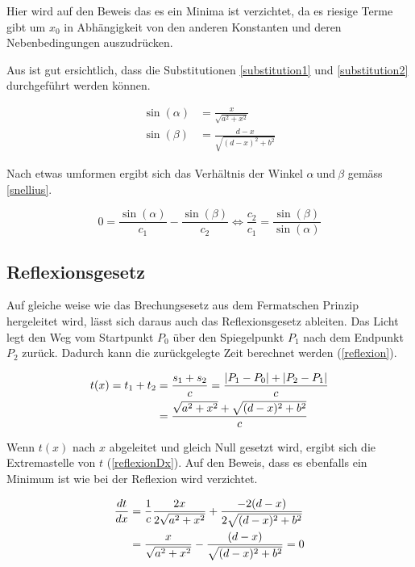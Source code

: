 Hier wird auf den Beweis das es ein Minima ist verzichtet, da es riesige Terme gibt um $x_0$ in Abhängigkeit von den anderen Konstanten und deren Nebenbedingungen auszudrücken.

Aus  ist gut ersichtlich, dass die Substitutionen \ref{substitution1} und \ref{substitution2} durchgeführt werden können.

\begin{align}
	\sin(\alpha) &= \frac{x}{\sqrt{a^2 + x^2}}  \label{substitution1}\\
	\sin(\beta) &= \frac{d-x}{\sqrt{(d -x)^2 + b^2}} \label{substitution2}
\end{align}

Nach etwas umformen ergibt sich das Verhältnis der Winkel $\alpha \ \text{und} \ \beta$ gemäss \eqref{snellius}.

\begin{equation}
	0 = \frac{\sin(\alpha)}{c_1} - \frac{\sin(\beta)}{c_2} \Leftrightarrow\frac{c_2}{c_1} = \frac{\sin(\beta)}{\sin(\alpha)}
	\label{snellius}
\end{equation}


\subsection{Reflexionsgesetz}
Auf gleiche weise wie das Brechungsesetz aus dem Fermatschen Prinzip hergeleitet wird, 
lässt sich daraus auch das Reflexionsgesetz ableiten.
Das Licht legt den Weg vom Startpunkt $P_0$ über den Spiegelpunkt $P_1$ 
nach dem Endpunkt $P_2$ zurück. Dadurch kann die zurückgelegte Zeit berechnet werden \cite{Wikipedia} (\eqref{reflexion}).


\begin{align}
t(x) = t_1 + t_2 &= \frac{s_1 + s_2}{c} = \frac{|P_1 - P_0| + |P_2 - P_1|}{c} \notag \\
&= \frac{\sqrt{a^2 + x^2} + \sqrt{(d-x)^2 + b^2}}{c} \label{reflexion}
\end{align}

Wenn $t(x)$ nach $x$ abgeleitet und gleich Null gesetzt wird, ergibt sich die Extremastelle  von $t$ (\eqref{reflexionDx}). Auf den Beweis, dass es ebenfalls ein Minimum ist wie bei der Reflexion wird verzichtet.

\begin{align}
\frac{dt}{dx} &= \frac{1}{c}  \frac{2  x}{2  \sqrt{a^2 + x^2}} + \frac{-2  (d-x)}{2  \sqrt{(d-x)^2 + b^2}} \notag \\
&= \frac{x}{ \sqrt{a^2 + x^2}} - \frac{(d-x)}{ \sqrt{(d-x)^2 + b^2}} = 0 \label{reflexionDx}
\end{align}



